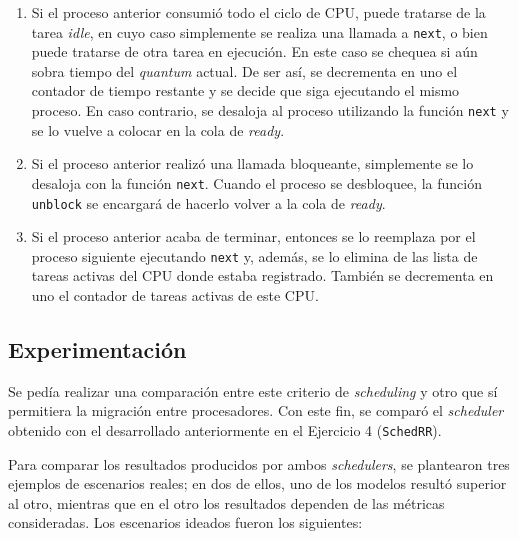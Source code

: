 \begin{enumerate}
    \item Si el proceso anterior consumió todo el ciclo de CPU, puede tratarse
    de la tarea \emph{idle}, en cuyo caso simplemente se realiza una llamada a
    \texttt{next}, o bien puede tratarse de otra tarea en ejecución. En este
    caso se chequea si aún sobra tiempo del \emph{quantum} actual. De ser así,
    se decrementa en uno el contador de tiempo restante y se decide que siga
    ejecutando el mismo proceso. En caso contrario, se desaloja al proceso
    utilizando la función \texttt{next} y se lo vuelve a colocar en la cola de
    \emph{ready}.
    \item Si el proceso anterior realizó una llamada bloqueante, simplemente se
    lo desaloja con la función \texttt{next}. Cuando el proceso se desbloquee,
    la función \texttt{unblock} se encargará de hacerlo volver a la cola de
    \emph{ready}.
    \item Si el proceso anterior acaba de terminar, entonces se lo reemplaza por
    el proceso siguiente ejecutando \texttt{next} y, además, se lo elimina de
    las lista de tareas activas del CPU donde estaba registrado. También se
    decrementa en uno el contador de tareas activas de este CPU.
\end{enumerate}

\subsection{Experimentación}

Se pedía realizar una comparación entre este criterio de \emph{scheduling}
y otro que sí permitiera la migración entre procesadores. Con este fin, se
comparó el \emph{scheduler} obtenido con el desarrollado anteriormente en el
Ejercicio 4 (\texttt{SchedRR}).

Para comparar los resultados producidos por ambos \emph{schedulers}, se
plantearon tres ejemplos de escenarios reales; en dos de ellos, uno de los
modelos resultó superior al otro, mientras que en el otro los resultados
dependen de las métricas consideradas. Los escenarios ideados fueron los
siguientes:

